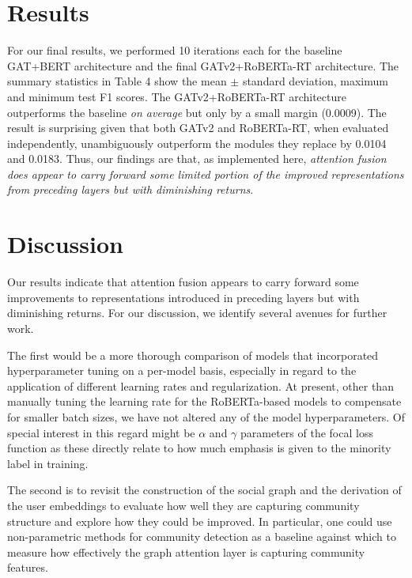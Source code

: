 \documentclass[letterpaper]{article} %
\begin{document}
\section{Results}

For our final results, we performed 10 iterations each for the baseline GAT+BERT architecture and the final GATv2+RoBERTa-RT architecture. The summary statistics in Table 4 show the mean $\pm$ standard deviation, maximum and minimum test F1 scores. The GATv2+RoBERTa-RT architecture outperforms the baseline \textit{on average} but only by a small margin (0.0009). The result is surprising given that both GATv2 and RoBERTa-RT, when evaluated independently, unambiguously outperform the modules they replace by 0.0104 and 0.0183. Thus, our findings are that, as implemented here, \textit{attention fusion does appear to carry forward some limited portion of the improved representations from preceding layers but with diminishing returns}. 


\section{Discussion}

Our results indicate that attention fusion appears to carry forward some improvements to representations introduced in preceding layers but with diminishing returns. For our discussion, we identify several avenues for further work. 

The first would be a more thorough comparison of models that incorporated hyperparameter tuning on a per-model basis, especially in regard to the application of different learning rates and regularization. At present, other than manually tuning the learning rate for the RoBERTa-based models to compensate for smaller batch sizes, we have not altered any of the model hyperparameters. Of special interest in this regard might be $\alpha$ and $\gamma$ parameters of the focal loss function as these directly relate to how much emphasis is given to the minority label in training. 

The second is to revisit the construction of the social graph and the derivation of the user embeddings to evaluate how well they are capturing community structure and explore how they could be improved. In particular, one could use non-parametric methods for community detection as a baseline against which to measure how effectively the graph attention layer is capturing community features. 
\end{document}
